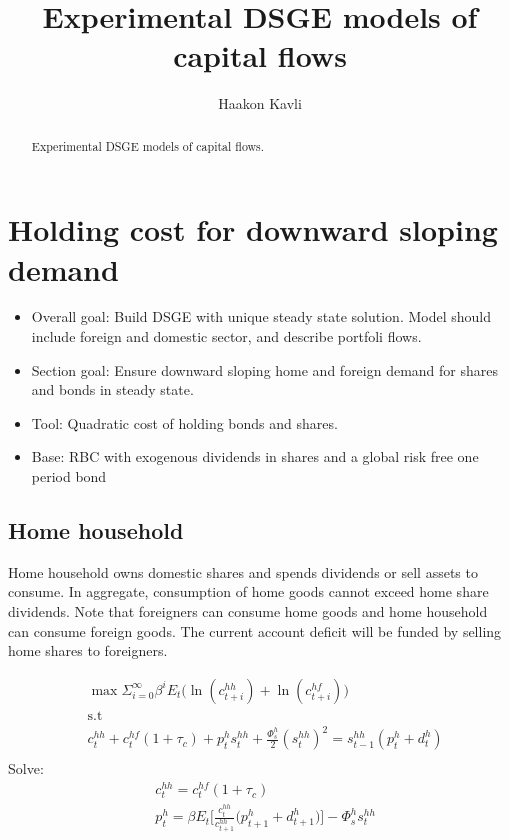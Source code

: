 \documentclass[a4paper]{article}
\begin{document}
\title{Experimental DSGE models of capital flows}
\author{Haakon Kavli}
\maketitle
\begin{abstract}
Experimental DSGE models of capital flows. 
\end{abstract}

\section{Holding cost for downward sloping demand}\label{HoldingCost}
\begin{itemize}
\item Overall goal: Build DSGE with unique steady state solution. Model should include foreign and domestic sector, and describe portfoli flows. 
\item Section goal: Ensure downward sloping home and foreign demand for shares and bonds in steady state. 
\item Tool: Quadratic cost of holding bonds and shares. 
\item Base: RBC with exogenous dividends in shares and a global risk free one period bond
\end{itemize}

\subsection{Home household}
Home household owns domestic shares and spends dividends or sell assets to consume. In aggregate, consumption of home goods cannot exceed home share dividends. Note that foreigners can consume home goods and home household can consume foreign goods. The current account deficit will be funded by selling home shares to foreigners. 

\begin{align*}
&\max \Sigma_{i=0}^\infty \beta^i E_t \bigg(\ln(c^{hh}_{t+i})+ \ln(c^{hf}_{t+i}) \bigg)\\ &\text{s.t}\\
&c^{hh}_t+c^{hf}_t(1+\tau_c)+ p^{h}_t s^{hh}_t+\frac{\Phi^h_s}{2}(s^{hh}_t)^2 =s^{hh}_{t-1}(p^{h}_t+d^{h}_t)\\
\end{align*}
Solve:
\begin{align}
&c^{hh}_t=c^{hf}_t(1+\tau_c)\\
&p^{h}_t=\beta E_t \bigg[\frac{c^{hh}_t}{c^{hh}_{t+1}} \bigg(  p^{h}_{t+1}+d^{h}_{t+1} \bigg) \bigg] - \Phi^h_s s^{hh}_t
\end{align}
\end{document}
